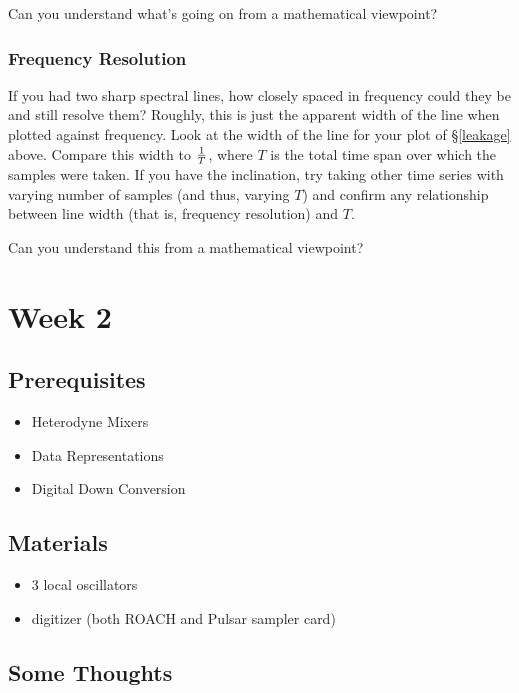 \documentclass[11pt]{article}
\begin{document}
Can you understand what's going on from a mathematical viewpoint?

\subsubsection{Frequency Resolution}

If you had two sharp spectral lines, how closely spaced in frequency
could they be and still resolve them? Roughly, this is just the apparent
width of the line when plotted against frequency. Look at the width of
the line for your plot of \S \ref{leakage} above. Compare this width to
$1 \over T$, where $T$ is the total time span over which the samples
were taken. If you have the inclination, try taking other time series
with varying number of samples (and thus, varying $T$) and confirm any
relationship between line width (that is, frequency resolution) and
$T$.

Can you understand this from a mathematical viewpoint?

\section{Week 2}
\subsection*{Prerequisites}

\begin{itemize}[noitemsep,nolistsep]
\item Heterodyne Mixers
\item Data Representations
\item Digital Down Conversion
\end{itemize}

\subsection*{Materials}

\begin{itemize}[noitemsep,nolistsep]
\item 3 local oscillators
\item digitizer (both ROACH and Pulsar sampler card)
\end{itemize}

\subsection*{Some Thoughts}
\end{document}
